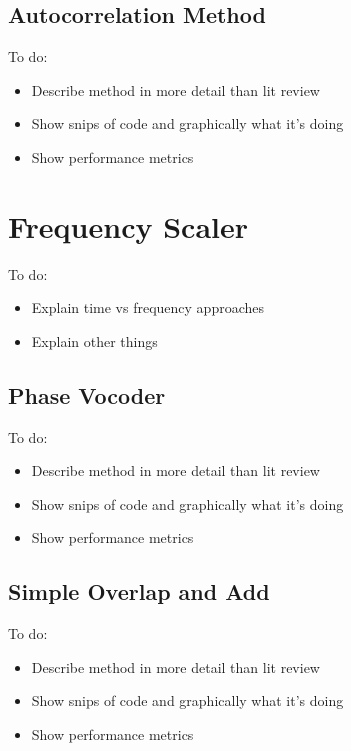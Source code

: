 \subsection{Autocorrelation Method}

\color{red}
To do:
\begin{itemize}
	\item Describe method in more detail than lit review
	\item Show snips of code and graphically what it's doing
	\item Show performance metrics
\end{itemize}
\color{black}

\section{Frequency Scaler}

\color{red}
To do:
\begin{itemize}
	\item Explain time vs frequency approaches
	\item Explain other things
\end{itemize}
\color{black}

\subsection{Phase Vocoder}

\color{red}
To do:
\begin{itemize}
	\item Describe method in more detail than lit review
	\item Show snips of code and graphically what it's doing
	\item Show performance metrics
\end{itemize}
\color{black}

\subsection{Simple Overlap and Add}

\color{red}
To do:
\begin{itemize}
	\item Describe method in more detail than lit review
	\item Show snips of code and graphically what it's doing
	\item Show performance metrics
\end{itemize}
\color{black}

